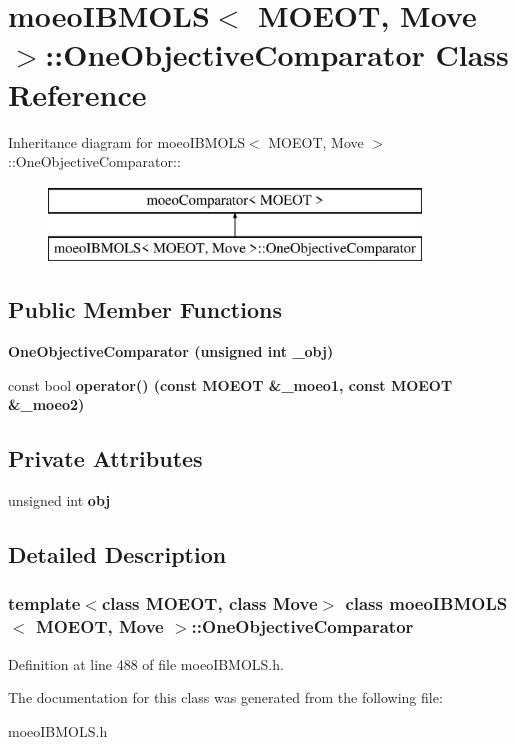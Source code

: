 \section{moeo\-IBMOLS$<$ MOEOT, Move $>$::One\-Objective\-Comparator Class Reference}
\label{classmoeoIBMOLS_1_1OneObjectiveComparator}
Inheritance diagram for moeo\-IBMOLS$<$ MOEOT, Move $>$::One\-Objective\-Comparator::\begin{figure}[H]
\begin{center}
\leavevmode
\includegraphics[height=2cm]{classmoeoIBMOLS_1_1OneObjectiveComparator}
\end{center}
\end{figure}
\subsection*{Public Member Functions}
\begin{CompactItemize}
\item 
\bf{One\-Objective\-Comparator} (unsigned int \_\-obj)\label{classmoeoIBMOLS_1_1OneObjectiveComparator_09ee419d143aa29bb05d48c358655bb1}

\item 
const bool \bf{operator()} (const MOEOT \&\_\-moeo1, const MOEOT \&\_\-moeo2)\label{classmoeoIBMOLS_1_1OneObjectiveComparator_44685d0ab08fede366bb404fe7f36302}

\end{CompactItemize}
\subsection*{Private Attributes}
\begin{CompactItemize}
\item 
unsigned int \bf{obj}\label{classmoeoIBMOLS_1_1OneObjectiveComparator_724ca0379e42fdffe4ec0d788cd52f43}

\end{CompactItemize}


\subsection{Detailed Description}
\subsubsection*{template$<$class MOEOT, class Move$>$ class moeo\-IBMOLS$<$ MOEOT, Move $>$::One\-Objective\-Comparator}





Definition at line 488 of file moeo\-IBMOLS.h.

The documentation for this class was generated from the following file:\begin{CompactItemize}
\item 
moeo\-IBMOLS.h\end{CompactItemize}
